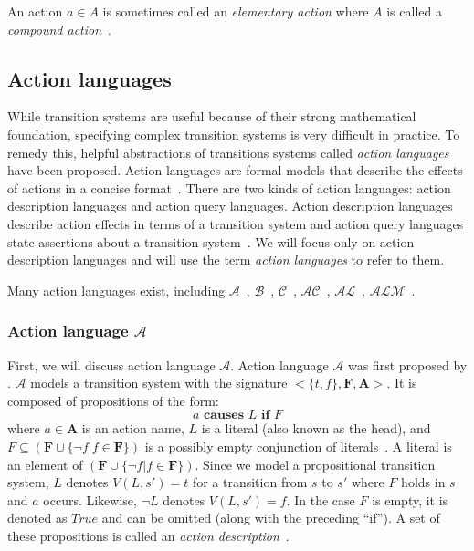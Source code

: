 \begin{definition}
    An action $a \in A$ is sometimes called an \textit{elementary action} where $A$ is called a \textit{compound action}~\citep{gelfond_authorization_2008}.
\end{definition}

\subsection{Action languages}
\label{subsec:action_languages}

While transition systems are useful because of their strong mathematical foundation, specifying complex transition systems is very difficult in practice.
To remedy this, helpful abstractions of transitions systems called \textit{action languages} have been proposed.
Action languages are formal models that describe the effects of actions in a concise format~\citep{gelfond_action_1998}.
There are two kinds of action languages: action description languages and action query languages.
Action description languages describe action effects in terms of a transition system and action query languages state assertions about a transition system~\citep{gelfond_action_1998}.
We will focus only on action description languages and will use the term \textit{action languages} to refer to them.

Many action languages exist, including $ \mathcal{A} $~\citep{gelfond_action_1998}, $ \mathcal{B} $~\citep{gelfond_action_1998}, $ \mathcal{C} $~\citep{gelfond_action_1998}, $ \mathcal{AC} $~\citep{turner_representing_1997}, $ \mathcal{AL} $~\citep{baral_reasoning_2000}, $ \mathcal{ALM} $~\citep{inclezan_modular_2016}.

\subsubsection{Action language $ \mathcal{A} $}
\label{subsubsec:action_language_a}

First, we will discuss action language $ \mathcal{A} $.
Action language $ \mathcal{A} $ was first proposed by \citet{pednault_formulating_1987}.
$ \mathcal{A} $ models a transition system with the signature $ <\{t, f\}, \boldsymbol{F}, \boldsymbol{A}> $.
It is composed of propositions of the form:
\begin{equation}
    a \textbf{ causes } L \textbf{ if } F
\end{equation}
where $ a \in \boldsymbol{A} $ is an action name, $ L $ is a literal (also known as the head), and $ F \subseteq(\boldsymbol{F} \cup\{\neg f | f \in \boldsymbol{F}\}) $ is a possibly empty conjunction of literals~\citep{gelfond_action_1998}.
A literal is an element of $(\boldsymbol{F} \cup \{\neg f | f \in \boldsymbol{F}\})$.
Since we model a propositional transition system, $L$ denotes $V(L, s') = t$ for a transition from $s$ to $s'$ where $F$ holds in $s$ and $a$ occurs.
Likewise, $\neg L$ denotes $V(L, s')=f$.
In the case $ F $ is empty, it is denoted as $ True $ and can be omitted (along with the preceding ``if'').
A set of these propositions is called an \textit{action description}~\citep{gelfond_action_1998}.

